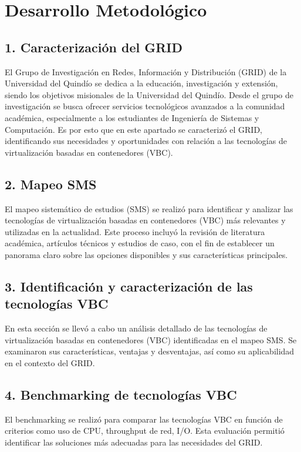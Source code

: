 \chapter*{Desarrollo Metodológico}
\label{cap:desarrolloMetodologico}
\section*{1. Caracterización del GRID}
El Grupo de Investigación en Redes, Información y Distribución (GRID) de la Universidad del Quindío se dedica a la educación, investigación y extensión, siendo los objetivos misionales de la Universidad del Quindío. 
Desde el grupo de investigación se busca ofrecer servicios tecnológicos avanzados a la comunidad académica, especialmente a los estudiantes de Ingeniería de Sistemas y Computación.
Es por esto que en este apartado se caracterizó el GRID, identificando sus necesidades y oportunidades con relación a las tecnologías de virtualización basadas en contenedores (VBC).

\section*{2. Mapeo SMS}
El mapeo sistemático de estudios (SMS) se realizó para identificar y analizar las tecnologías de virtualización basadas en contenedores (VBC) más relevantes 
y utilizadas en la actualidad. Este proceso incluyó la revisión de literatura académica, artículos técnicos y estudios de caso, con el fin de establecer un 
panorama claro sobre las opciones disponibles y sus características principales.

\section*{3. Identificación y caracterización de las tecnologías VBC}
En esta sección se llevó a cabo un análisis detallado de las tecnologías de virtualización basadas en contenedores (VBC) identificadas en el mapeo SMS. Se examinaron sus características, ventajas y desventajas, así como su aplicabilidad en el contexto del GRID.

\section*{4. Benchmarking de tecnologías VBC}
El benchmarking se realizó para comparar las tecnologías VBC en función de criterios como uso de CPU, throughput de red, I/O. Esta evaluación permitió identificar las soluciones más adecuadas para las necesidades del GRID.

